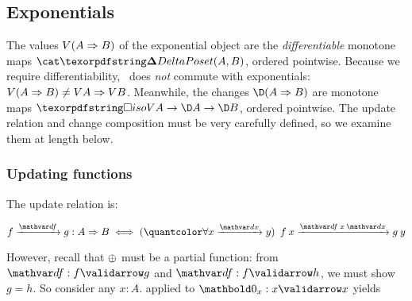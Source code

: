 



\subsection{Exponentials}
\label{sec:CP-exponentials}

The values $V{(A \Rightarrow B)}$ of the exponential object are the
\emph{differentiable} monotone maps $\CP(A, B)$, ordered pointwise. Because we
require differentiability, \valfn\ does \emph{not} commute with exponentials:
$V{(A \Rightarrow B)} \ne V A \Rightarrow V B$.
%
Meanwhile, the changes $\chgs{(\expO A B)}$ are monotone maps $\isof{\vals A}
\to \chgs A \to \chgs B$, ordered pointwise. The update relation and change
composition must be very carefully defined, so we examine them at length below.

\subsubsection{Updating functions}

The update relation is:

\nopagebreak[2]
\begin{equation}\label{eqn:function-update}
  \vld{\df}{f}{g} : \expO A B
  \iff \fa{\vld\dx x y} \vld{\df\<x\<\dx} {f\<x} {g\<y}
\end{equation}

\noindent However, recall that $\mathbin{\oplus}$ must be a partial function: from
$\valid\df f g$ and $\valid\df f h$, we must show $g = h$. So consider any $x :
A$.  applied to $\valid{\zero_x} x x$ yields

